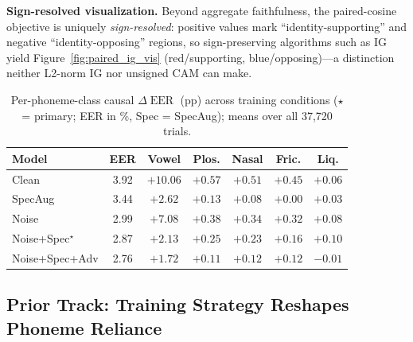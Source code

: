 \documentclass{article}
\DeclareMathOperator{\EER}{EER}
\newcommand{\dEER}{\Delta\EER}
\begin{document}
\textbf{Sign-resolved visualization.} Beyond aggregate faithfulness, the paired-cosine objective is uniquely \emph{sign-resolved}: positive values mark ``identity-supporting'' and negative ``identity-opposing'' regions, so sign-preserving algorithms such as IG yield Figure~\ref{fig:paired_ig_vis} (red/supporting, blue/opposing)---a distinction neither L2-norm IG nor unsigned CAM can make.


\begin{table}[t]
\centering
\caption{Per-phoneme-class causal $\dEER$ (pp) across training conditions ($\star$ = primary; EER in \%, Spec = SpecAug); means over all 37{,}720 trials.}
\label{tab:prior}
\small
\setlength{\tabcolsep}{1.0pt}
\begin{tabular}{lcccccc}
\toprule
Model & EER & Vowel & Plos. & Nasal & Fric. & Liq. \\
\midrule
Clean              & 3.92 & $+10.06$ & $+0.57$ & $+0.51$ & $+0.45$ & $+0.06$ \\
SpecAug            & 3.44 & $+2.62$  & $+0.13$ & $+0.08$ & $+0.00$ & $+0.03$ \\
Noise              & 2.99 & $+7.08$  & $+0.38$ & $+0.34$ & $+0.32$ & $+0.08$ \\
Noise+Spec$^\star$ & 2.87 & $+2.13$ & $+0.25$ & $+0.23$ & $+0.16$ & $+0.10$ \\
Noise+Spec+Adv     & 2.76 & $+1.72$  & $+0.11$ & $+0.12$ & $+0.12$ & $-0.01$ \\
\bottomrule
\end{tabular}
\end{table}

\subsection{Prior Track: Training Strategy Reshapes Phoneme Reliance}
\end{document}
